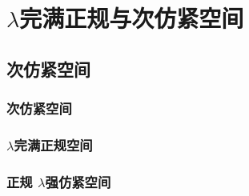 \documentclass[main.tex]{subfiles}
\begin{document}
	
\part{$\lambda$完满正规与次仿紧空间}\label{part4}
	
\chapter{次仿紧空间}\label{ch9}
	
	\section{次仿紧空间}\label{sec:4.1}
	
	
	\section{$\lambda$完满正规空间}\label{sec:4.2}
	
	
	\section{正规	$\lambda$强仿紧空间}\label{sec:4.3}
	
\end{document}
